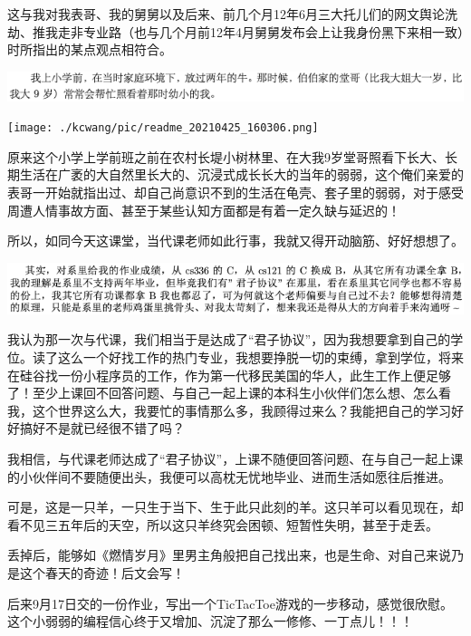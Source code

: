 \documentclass[9pt, b5paper]{article}
\begin{document}
这与我对我表哥、我的舅舅以及后来、前几个月12年6月三大托儿们的网文舆论洗劫、推我走非专业路（也与几个月前12年4月舅舅发布会上让我身份黑下来相一致）时所指出的某点观点相符合。

\begin{center}
\includegraphics[width=.9\linewidth]{./pic/backups_plans_20210425_154237.png}
\end{center}

\begin{center}
\texttt{[image: ./kcwang/pic/readme\_20210425\_160306.png]}
\end{center}

原来这个小学上学前班之前在农村长堤小树林里、在大我9岁堂哥照看下长大、长期生活在广袤的大自然里长大的、沉浸式成长长大的当年的弱弱，这个俺们亲爱的表哥一开始就指出过、却自己尚意识不到的生活在龟壳、套子里的弱弱，对于感受周遭人情事故方面、甚至于某些认知方面都是有着一定久缺与延迟的！

所以，如同今天这课堂，当代课老师如此行事，我就又得开动脑筋、好好想想了。

\begin{center}
\includegraphics[width=.9\linewidth]{./pic/backups_plans_20210425_154431.png}
\end{center}

我认为那一次与代课，我们相当于是达成了“君子协议”，因为我想要拿到自己的学位。读了这么一个好找工作的热门专业，我想要挣脱一切的束缚，拿到学位，将来在硅谷找一份小程序员的工作，作为第一代移民美国的华人，此生工作上便足够了！至少上课回不回答问题、与自己一起上课的本科生小伙伴们怎么想、怎么看我，这个世界这么大，我要忙的事情那么多，我顾得过来么？我能把自己的学习好好搞好不是就已经很不错了吗？

我相信，与代课老师达成了“君子协议”，上课不随便回答问题、在与自己一起上课的小伙伴间不要随便出头，我便可以高枕无忧地毕业、进而生活如愿往后推进。

可是，这是一只羊，一只生于当下、生于此只此刻的羊。这只羊可以看见现在，却看不见三五年后的天空，所以这只羊终究会困顿、短暂性失明，甚至于走丢。

丢掉后，能够如《燃情岁月》里男主角般把自己找出来，也是生命、对自己来说乃是这个春天的奇迹！后文会写！

后来9月17日交的一份作业，写出一个TicTacToe游戏的一步移动，感觉很欣慰。这个小弱弱的编程信心终于又增加、沉淀了那么一修修、一丁点儿！！！
\end{document}
